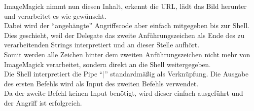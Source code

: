 ImageMagick nimmt nun diesen Inhalt, erkennt die URL, lädt das Bild herunter und verarbeitet es wie gewünscht.\\

Dabei wird der "`angehängte"' Angriffscode aber einfach mitgegeben bis zur Shell.\\
Dies geschieht, weil der Delegate das zweite Anführungszeichen als Ende des zu verarbeitenden Strings interpretiert und an dieser Stelle aufhört.\\
Somit werden alle Zeichen hinter dem zweiten Anführungszeichen nicht mehr von ImageMagick verarbeitet, sondern direkt an die Shell weitergegeben.\\
Die Shell interpretiert die Pipe "`|"' standardmäßig als Verknüpfung. Die Ausgabe des ersten Befehls wird als Input des zweiten Befehls verwendet.\\
Da der zweite Befehl keinen Input benötigt, wird dieser einfach ausgeführt und der Angriff ist erfolgreich.\\

